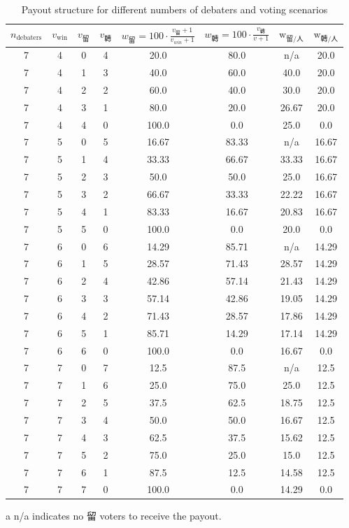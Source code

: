\begin{table}[H]
    \centering
    \small
    \begin{threeparttable}
    \begin{tabular}{cccccccc}
    \toprule
    $n_{\text{debaters}}$ & $v_{\text{win}}$ & $v_{\text{留}}$ & $v_{\text{轉}}$ & $w_{\text{留}} = 100 \cdot \frac{v_{\text{留}}+1}{v_{win}+1} $ & $w_{\text{轉}} = 100\cdot\frac{v_{\text{轉}}}{v+1}$ & $\text{w}_{\text{留}/\text{人} }$ & $\text{w}_{\text{轉}/\text{人}}$ \\
    \midrule
7 & 4 & 0 & 4 & 20.0 & 80.0 & n/a\tnote{a} & 20.0 \\
7 & 4 & 1 & 3 & 40.0 & 60.0 & 40.0 & 20.0 \\
7 & 4 & 2 & 2 & 60.0 & 40.0 & 30.0 & 20.0 \\
7 & 4 & 3 & 1 & 80.0 & 20.0 & 26.67 & 20.0 \\
7 & 4 & 4 & 0 & 100.0 & 0.0 & 25.0 & 0.0 \\
7 & 5 & 0 & 5 & 16.67 & 83.33 & n/a\tnote{a} & 16.67 \\
7 & 5 & 1 & 4 & 33.33 & 66.67 & 33.33 & 16.67 \\
7 & 5 & 2 & 3 & 50.0 & 50.0 & 25.0 & 16.67 \\
7 & 5 & 3 & 2 & 66.67 & 33.33 & 22.22 & 16.67 \\
7 & 5 & 4 & 1 & 83.33 & 16.67 & 20.83 & 16.67 \\
7 & 5 & 5 & 0 & 100.0 & 0.0 & 20.0 & 0.0 \\
7 & 6 & 0 & 6 & 14.29 & 85.71 & n/a\tnote{a} & 14.29 \\
7 & 6 & 1 & 5 & 28.57 & 71.43 & 28.57 & 14.29 \\
7 & 6 & 2 & 4 & 42.86 & 57.14 & 21.43 & 14.29 \\
7 & 6 & 3 & 3 & 57.14 & 42.86 & 19.05 & 14.29 \\
7 & 6 & 4 & 2 & 71.43 & 28.57 & 17.86 & 14.29 \\
7 & 6 & 5 & 1 & 85.71 & 14.29 & 17.14 & 14.29 \\
7 & 6 & 6 & 0 & 100.0 & 0.0 & 16.67 & 0.0 \\
7 & 7 & 0 & 7 & 12.5 & 87.5 & n/a\tnote{a} & 12.5 \\
7 & 7 & 1 & 6 & 25.0 & 75.0 & 25.0 & 12.5 \\
7 & 7 & 2 & 5 & 37.5 & 62.5 & 18.75 & 12.5 \\
7 & 7 & 3 & 4 & 50.0 & 50.0 & 16.67 & 12.5 \\
7 & 7 & 4 & 3 & 62.5 & 37.5 & 15.62 & 12.5 \\
7 & 7 & 5 & 2 & 75.0 & 25.0 & 15.0 & 12.5 \\
7 & 7 & 6 & 1 & 87.5 & 12.5 & 14.58 & 12.5 \\
7 & 7 & 7 & 0 & 100.0 & 0.0 & 14.29 & 0.0 \\
\bottomrule
\end{tabular}
\begin{tablenotes}
    \item[a] n/a indicates no 留 voters to receive the payout.
\end{tablenotes}
\caption{Payout structure for different numbers of debaters and voting scenarios}
\end{threeparttable}
\end{table}


